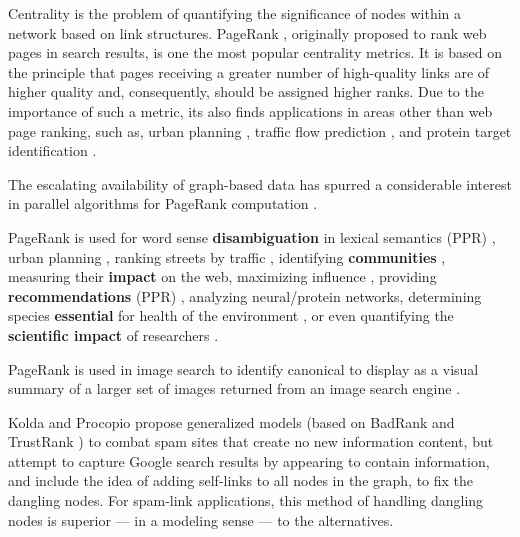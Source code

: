 Centrality is the problem of quantifying the significance of nodes within a network based on link structures. PageRank \cite{rank-page99}, originally proposed to rank web pages in search results, is one the most popular centrality metrics. It is based on the principle that pages receiving a greater number of high-quality links are of higher quality and, consequently, should be assigned higher ranks. Due to the importance of such a metric, its also finds applications in areas other than web page ranking, such as, urban planning \cite{urban-zhang18}, traffic flow prediction \cite{traffic-kim15}, and protein target identification \cite{banky2013equal}.

The escalating availability of graph-based data has spurred a considerable interest in parallel algorithms for PageRank computation \cite{rank-garg16, rank-nvgraph, rank-giri20, rank-sarma13}.

PageRank is used for word sense \textbf{disambiguation} in lexical semantics (PPR) \cite{de2010robust, duque2015co, agirre2010graph}, urban planning \cite{urban-zhang18}, ranking streets by traffic \cite{traffic-kim15}, identifying \textbf{communities} \cite{rank-kloumann17}, measuring their \textbf{impact} on the web, maximizing influence \cite{influence-zhang15}, providing \textbf{recommendations} (PPR) \cite{recommend-chaudhari17}, analyzing neural/protein networks, determining species \textbf{essential} for health of the environment \cite{allesina2009googling}, or even quantifying the \textbf{scientific impact} of researchers \cite{rank-senanayake15}.


PageRank is used in image search to identify canonical to display as a visual summary of a larger set of images returned from an image search engine \cite{rank-gleich15}.

Kolda and Procopio \cite{kolda2009generalized} propose generalized models (based on BadRank \cite{sobek2002pr0} and TrustRank \cite{rank-gyongyi04}) to combat spam sites that create no new information content, but attempt to capture Google search results by appearing to contain information, and include the idea of adding self-links to all nodes in the graph, to fix the dangling nodes. For spam-link applications, this method of handling dangling nodes is superior --- in a modeling sense --- to the alternatives.

